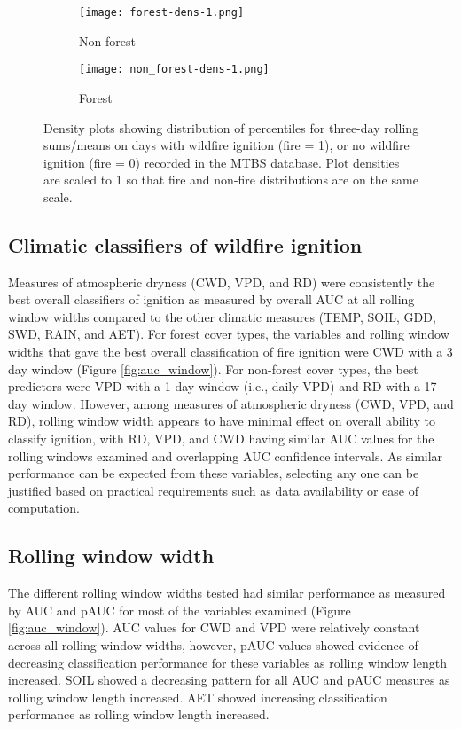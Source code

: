 \documentclass[11p]{article}
\begin{document}
\begin{figure}[htbp]
  \centering
  \begin{subfigure}{.5\textwidth}
    \centering
    \texttt{[image: forest-dens-1.png]}
    \caption{Non-forest}
    \label{fig:dens-nf}
  \end{subfigure}%
  \begin{subfigure}{.5\textwidth}
    \centering
    \texttt{[image: non\_forest-dens-1.png]}
    \caption{Forest}
    \label{fig:dens-f}
  \end{subfigure}
  \caption{Density plots showing distribution of percentiles for three-day rolling sums/means on days with wildfire ignition (fire = 1), or no wildfire ignition (fire = 0) recorded in the MTBS database. Plot densities are scaled to 1 so that fire and non-fire distributions are on the same scale.}
  \label{fig:dens}
\end{figure}

\subsection{Climatic classifiers of wildfire ignition}

Measures of atmospheric dryness (CWD, VPD, and RD) were consistently the best overall classifiers of ignition as measured by overall AUC at all rolling window widths compared to the other climatic measures (TEMP, SOIL, GDD, SWD, RAIN, and AET). For forest cover types, the variables and rolling window widths that gave the best overall classification of fire ignition were CWD with a 3 day window (Figure \ref{fig:auc_window}). For non-forest cover types, the best predictors were VPD with a 1 day window (i.e., daily VPD) and RD with a 17 day window. However, among measures of atmospheric dryness (CWD, VPD, and RD), rolling window width appears to have minimal effect on overall ability to classify ignition, with RD, VPD, and CWD having similar AUC values for the rolling windows examined and overlapping AUC confidence intervals. As similar performance can be expected from these variables, selecting any one can be justified based on practical requirements such as data availability or ease of computation.

\subsection{Rolling window width}

The different rolling window widths tested had similar performance as measured by AUC and pAUC for most of the variables examined (Figure \ref{fig:auc_window}). AUC values for CWD and VPD were relatively constant across all rolling window widths, however, pAUC values showed evidence of decreasing classification performance for these variables as rolling window length increased. SOIL showed a decreasing pattern for all AUC and pAUC measures as rolling window length increased. AET showed increasing classification performance as rolling window length increased.  
\end{document}
